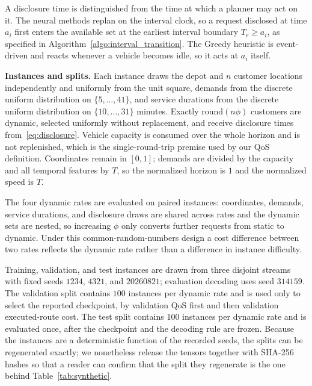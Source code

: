 A disclosure time is distinguished from the time at which a planner may act on
it. The neural methods replan on the interval clock, so a request disclosed at
time $a_i$ first enters the available set at the earliest interval boundary
$T_r \geq a_i$, as specified in Algorithm~\ref{algo:interval_transition}. The
Greedy heuristic is event-driven and reacts whenever a vehicle becomes idle, so
it acts at $a_i$ itself.



\textbf{Instances and splits.} Each instance draws the depot and $n$ customer
locations independently and uniformly from the unit square, demands from the
discrete uniform distribution on $\{5,\ldots,41\}$, and service durations from
the discrete uniform distribution on $\{10,\ldots,31\}$ minutes. Exactly
$\mathrm{round}(n\phi)$ customers are dynamic, selected uniformly without
replacement, and receive disclosure times from~\eqref{eq:disclosure}. Vehicle
capacity is consumed over the whole horizon and is not replenished, which is the
single-round-trip premise used by our QoS definition. Coordinates remain in
$[0,1]$; demands are divided by the capacity and all temporal features by $T$,
so the normalized horizon is $1$ and the normalized speed is $T$.

The four dynamic rates are evaluated on paired instances: coordinates, demands,
service durations, and disclosure draws are shared across rates and the dynamic
sets are nested, so increasing $\phi$ only converts further requests from static
to dynamic. Under this common-random-numbers design a cost difference between
two rates reflects the dynamic rate rather than a difference in instance
difficulty.

Training, validation, and test instances are drawn from three disjoint streams
with fixed seeds $1234$, $4321$, and $20260821$; evaluation decoding uses seed
$314159$. The validation split contains $100$ instances per dynamic rate and is
used only to select the reported checkpoint, by validation QoS first and then
validation executed-route cost. The test split contains $100$ instances per
dynamic rate and is evaluated once, after the checkpoint and the decoding rule
are frozen. Because the instances are a deterministic function of the recorded
seeds, the splits can be regenerated exactly; we nonetheless release the
tensors together with SHA-256 hashes so that a reader can confirm that the split
they regenerate is the one behind Table~\ref{tab:synthetic}.


